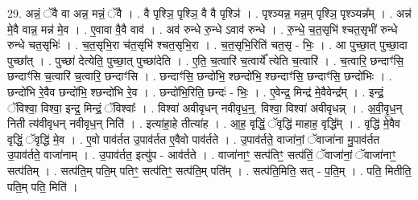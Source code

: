 \documentclass[17pt]{extarticle}
\begin{document}
29. अन्नं॒ ॅवै वा अन्न॒ मन्नं॒ ॅवै । . वै पृश्ञि॒ पृश्ञि॒ वै वै पृश्ञि॑ । . पृश्ञ्यन्न॒ मन्न॒म् पृश्ञि॒ पृश्ञ्यन्न᳚म् । . अन्न॑ मे॒वै वान्न॒ मन्न॑ मे॒व । . ए॒वावा वै॒वै वाव॑ । . अव॑ रुन्धे रु॒न्धे ऽवाव॑ रुन्धे । . रु॒न्धे॒ च॒त॒सृभि॑ श्चत॒सृभी॑ रुन्धे रुन्धे चत॒सृभिः॑ । . च॒त॒सृभि॒रा च॑त॒सृभि॑ श्चत॒सृभि॒रा । . च॒त॒सृभि॒रिति॑ चत॒सृ - भिः॒ । . आ पुच्छा॒त् पुच्छा॒दा पुच्छा᳚त् । . पुच्छा॑ देत्येति॒ पुच्छा॒त् पुच्छा॑देति । . ए॒ति॒ च॒त्वारि॑ च॒त्वार्ये᳚ त्येति च॒त्वारि॑ । . च॒त्वारि॒ छन्दाꣳ॑सि॒ छन्दाꣳ॑सि च॒त्वारि॑ च॒त्वारि॒ छन्दाꣳ॑सि । . छन्दाꣳ॑सि॒ छन्दो॑भि॒ श्छन्दो॑भि॒ श्छन्दाꣳ॑सि॒ छन्दाꣳ॑सि॒ छन्दो॑भिः । . छन्दो॑भि रे॒वैव छन्दो॑भि॒ श्छन्दो॑भि रे॒व । . छन्दो॑भि॒रिति॒ छन्दः॑ - भिः॒ । . ए॒वेन्द्र॒ मिन्द्र॑ मे॒वैवेन्द्र᳚म् । . इन्द्रं॒ ॅविश्वा॒ विश्वा॒ इन्द्र॒ मिन्द्रं॒ ॅविश्वाः᳚ । . विश्वा॑ अवीवृधन् नवीवृध॒न्॒. विश्वा॒ विश्वा॑ अवीवृधन्न् । . अ॒वी॒वृ॒ध॒न् निती त्य॑वीवृधन् नवीवृध॒न् निति॑ । . इत्या॑हा॒हे तीत्या॑ह । . आ॒ह॒ वृद्धिं॒ ॅवृद्धि॑ माहाह॒ वृद्धि᳚म् । . वृद्धि॑ मे॒वैव वृद्धिं॒ ॅवृद्धि॑ मे॒व । . ए॒वो पाव॑र्तत उ॒पाव॑र्तत ए॒वैवो पाव॑र्तते । . उ॒पाव॑र्तते॒ वाजा॑नां॒ ॅवाजा॑ना मु॒पाव॑र्तत उ॒पाव॑र्तते॒ वाजा॑नाम् । . उ॒पाव॑र्तत॒ इत्यु॑प - आव॑र्तते । . वाजा॑नाꣳ॒॒ सत्प॑तिꣳ॒॒ सत्प॑तिं॒ ॅवाजा॑नां॒ ॅवाजा॑नाꣳ॒॒ सत्प॑तिम् । . सत्प॑ति॒म् पति॒म् पतिꣳ॒॒ सत्प॑तिꣳ॒॒ सत्प॑ति॒म् पति᳚म् । . सत्प॑ति॒मिति॒ सत् - प॒ति॒म् । . पति॒ मितीति॒ पति॒म् पति॒ मिति॑ । \newline
\end{document}
